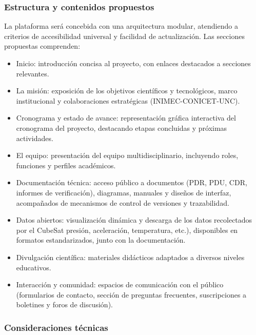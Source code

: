     \subsubsection{Estructura y contenidos propuestos}

    La plataforma será concebida con una arquitectura modular, atendiendo a criterios de
    accesibilidad universal y facilidad de actualización. Las secciones propuestas
    comprenden:

    \begin{itemize}

      \item Inicio: introducción concisa al proyecto, con enlaces destacados a secciones relevantes.

      \item La misión: exposición de los objetivos científicos y tecnológicos, marco institucional y
      colaboraciones estratégicas (INIMEC-CONICET-UNC).

      \item Cronograma y estado de avance: representación gráfica interactiva del cronograma del proyecto,
      destacando etapas concluidas y próximas actividades.

      \item El equipo: presentación del equipo multidisciplinario, incluyendo roles, funciones y perfiles
      académicos.

      \item Documentación técnica: acceso público a documentos (PDR, PDU, CDR, informes de verificación),
      diagramas, manuales y diseños de interfaz, acompañados de mecanismos de control de versiones y trazabilidad.

      \item Datos abiertos: visualización dinámica y descarga de los datos recolectados por el CubeSat 
      presión, aceleración, temperatura, etc.), disponibles en formatos estandarizados, junto con la
      documentación.

      \item Divulgación científica: materiales didácticos adaptados a diversos niveles
      educativos.

      \item Interacción y comunidad: espacios de comunicación con el público (formularios de contacto,
      sección de preguntas frecuentes, suscripciones a boletines y foros de discusión).
    \end{itemize}

      \subsubsection{Consideraciones técnicas}

